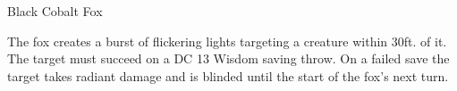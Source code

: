 \documentclass[letterpaper,openany,oneside,twocolumn]{book}
\begin{document}
\begin{DndMonster}[width=0.5\textwidth +0.5em]{Black Cobalt Fox}
    \DndMonsterAttack[
      name=Gore,
      distance=melee, %
      mod=+4,
      reach=5,
      targets=one target,
      dmg=\DndDice{2d6 + 2},
      dmg-type=piercing,
    ]
    
    The fox creates a burst of flickering lights targeting a creature within 30ft. of it. The target must succeed on a DC 13 Wisdom saving throw. On a failed save the target takes  radiant damage and is blinded until the start of the fox's next turn.
      
\end{DndMonster}
\end{document}
